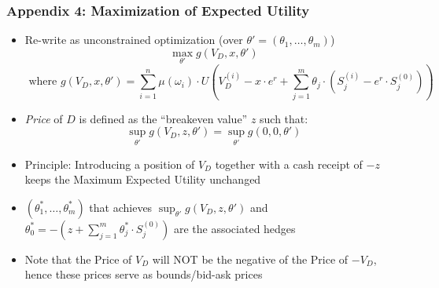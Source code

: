 \documentclass{beamer}
\begin{document}
\begin{frame}
\frametitle{Appendix 4: Maximization of Expected Utility}
\begin{itemize}
\item Re-write as unconstrained optimization (over $\theta' = (\theta_1, \ldots, \theta_m)$)
$$\max_{\theta'} g(V_D,x,\theta')$$
$$ \mbox{ where } g(V_D, x, \theta') = \sum_{i=1}^n \mu(\omega_i) \cdot U(V_D^{(i)} - x \cdot e^r + \sum_{j=1}^m \theta_j \cdot (S_j^{(i)} - e^r \cdot S_j^{(0)}))$$
\item {\em Price} of $D$ is defined as the ``breakeven value'' $z$ such that:
$$\sup_{\theta'} g(V_D, z, \theta') = \sup_{\theta'} g(0, 0, \theta')$$
\item Principle: Introducing a position of $V_D$ together with a cash receipt of $-z$ keeps the Maximum Expected Utility unchanged
\item $(\theta_1^*, \ldots, \theta_m^*)$ that achieves $\sup_{\theta'} g(V_D, z, \theta')$ and $\theta_0^* = -(z  + \sum_{j=1}^m \theta_j^* \cdot S_j^{(0)})$ are the associated hedges
\item Note that the Price of $V_D$ will NOT be the negative of the Price of $-V_D$, hence these prices serve as bounds/bid-ask prices
\end{itemize}
\end{frame}
\end{document}
